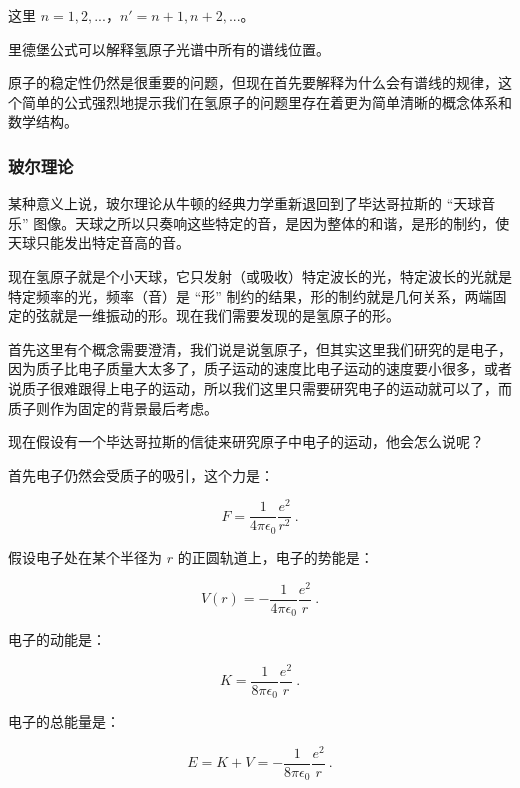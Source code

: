 这里 $n = 1,  2, ...$，$n' = n+1, n+2, ...$。

里德堡公式可以解释氢原子光谱中所有的谱线位置。

原子的稳定性仍然是很重要的问题，但现在首先要解释为什么会有谱线的规律，这个简单的公式强烈地提示我们在氢原子的问题里存在着更为简单清晰的概念体系和数学结构。

\subsubsection{玻尔理论}


某种意义上说，玻尔理论从牛顿的经典力学重新退回到了毕达哥拉斯的 “天球音乐” 图像。天球之所以只奏响这些特定的音，是因为整体的和谐，是形的制约，使天球只能发出特定音高的音。

现在氢原子就是个小天球，它只发射（或吸收）特定波长的光，特定波长的光就是特定频率的光，频率（音）是 “形” 制约的结果，形的制约就是几何关系，两端固定的弦就是一维振动的形。现在我们需要发现的是氢原子的形。

首先这里有个概念需要澄清，我们说是说氢原子，但其实这里我们研究的是电子，因为质子比电子质量大太多了，质子运动的速度比电子运动的速度要小很多，或者说质子很难跟得上电子的运动，所以我们这里只需要研究电子的运动就可以了，而质子则作为固定的背景最后考虑。

现在假设有一个毕达哥拉斯的信徒来研究原子中电子的运动，他会怎么说呢？

首先电子仍然会受质子的吸引，这个力是：

\begin{equation}
F = \frac{1}{4 \pi \epsilon_0} \frac{e^2}{ r^2 }~.
\end{equation}

假设电子处在某个半径为 $r$ 的正圆轨道上，电子的势能是：

\begin{equation}
V(r) = - \frac{1}{4 \pi \epsilon_0} \frac{e^2}{ r }~.
\end{equation}

电子的动能是：

\begin{equation}
K = \frac{1}{8 \pi \epsilon_0} \frac{e^2}{ r }~.
\end{equation}

电子的总能量是：

\begin{equation}
E = K + V = - \frac{1}{8 \pi \epsilon_0} \frac{e^2}{ r }~.
\end{equation}

